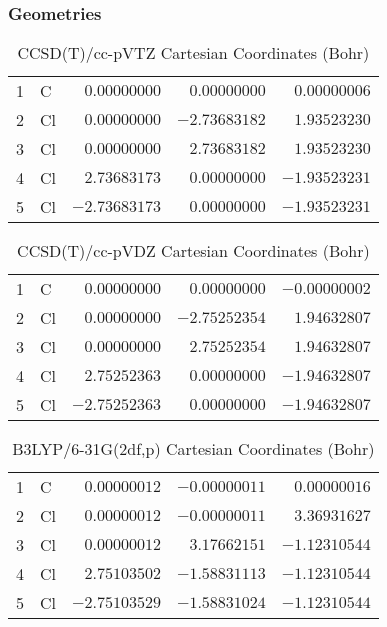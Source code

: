 \documentclass[10pt,oneside]{article}
\begin{document}
\clearpage

\subsection{\ \ \ }

\subsubsection*{Geometries}
\begin{table}[h!]
\centering
\caption{CCSD(T)/cc-pVTZ Cartesian Coordinates (Bohr)}
\begin{tabular}{llrrr}
1  & C  & $ 0.00000000$ & $ 0.00000000$ & $ 0.00000006$ \\
2  & Cl & $ 0.00000000$ & $-2.73683182$ & $ 1.93523230$ \\
3  & Cl & $ 0.00000000$ & $ 2.73683182$ & $ 1.93523230$ \\
4  & Cl & $ 2.73683173$ & $ 0.00000000$ & $-1.93523231$ \\
5  & Cl & $-2.73683173$ & $ 0.00000000$ & $-1.93523231$ \\
\end{tabular}
\end{table}

\begin{table}[h!]
\centering
\caption{CCSD(T)/cc-pVDZ Cartesian Coordinates (Bohr)}
\begin{tabular}{llrrr}
1  & C  & $ 0.00000000$ & $ 0.00000000$ & $-0.00000002$ \\
2  & Cl & $ 0.00000000$ & $-2.75252354$ & $ 1.94632807$ \\
3  & Cl & $ 0.00000000$ & $ 2.75252354$ & $ 1.94632807$ \\
4  & Cl & $ 2.75252363$ & $ 0.00000000$ & $-1.94632807$ \\
5  & Cl & $-2.75252363$ & $ 0.00000000$ & $-1.94632807$ \\
\end{tabular}
\end{table}

\begin{table}[h!]
\centering
\caption{B3LYP/6-31G(2df,p) Cartesian Coordinates (Bohr)}
\begin{tabular}{llrrr}
1  & C  & $ 0.00000012$ & $-0.00000011$ & $ 0.00000016$ \\
2  & Cl & $ 0.00000012$ & $-0.00000011$ & $ 3.36931627$ \\
3  & Cl & $ 0.00000012$ & $ 3.17662151$ & $-1.12310544$ \\
4  & Cl & $ 2.75103502$ & $-1.58831113$ & $-1.12310544$ \\
5  & Cl & $-2.75103529$ & $-1.58831024$ & $-1.12310544$ \\
\end{tabular}
\end{table}
\end{document}
